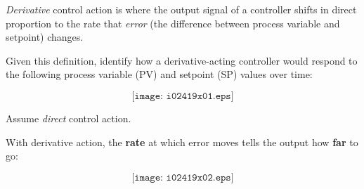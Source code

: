 

{\it Derivative} control action is where the output signal of a controller shifts in direct proportion to the rate that {\it error} (the difference between process variable and setpoint) changes.

Given this definition, identify how a derivative-acting controller would respond to the following process variable (PV) and setpoint (SP) values over time:

$$\texttt{[image: i02419x01.eps]}$$

Assume {\it direct} control action.







With derivative action, the {\bf rate} at which error moves tells the output how {\bf far} to go:

$$\texttt{[image: i02419x02.eps]}$$











